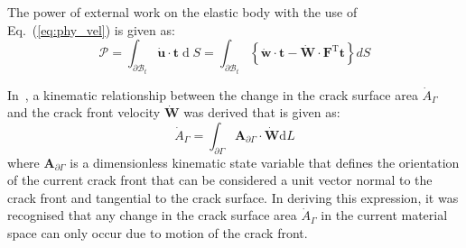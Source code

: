 \documentclass[twocolumn]{svjour3}
\begin{document}
The power of external work on the elastic body with the use of Eq.~(\ref{eq:phy_vel}) is given as: 
\begin{equation} \label{eq:extern_pow}
	\mathscr{P} =\int_{\partial \mathscr{B}_{t}} \dot{\mathbf{u}} \cdot \mathbf{t} \operatorname{d} S=\int_{\partial \mathscr{B}_{t}}\left\{\dot{\mathbf{w}} \cdot \mathbf{t}-\dot{\mathbf{W}} \cdot \mathbf{F}^{\mathrm{T}} \mathbf{t}\right\} d S
\end{equation}

In~\cite{kaczmarczyk2017energy}, a kinematic relationship between the change in the
crack surface area $\dot{A}_\Gamma$ and the crack front velocity $\dot{\mathbf{W}}$ was derived that is given as:
\begin{equation}
\label{eq::Agamma2}
\dot{A}_\Gamma
 =
\int_{\partial\Gamma}
\mathbf{A}_{\partial\Gamma} \cdot \dot{\mathbf{W}} \textrm{d}L
\end{equation}
where 
$\mathbf{A}_{\partial\Gamma}$ is a dimensionless kinematic state variable that defines the orientation of the current crack front that can be considered a unit vector normal to the crack front and tangential to the crack surface. In deriving this expression, it was recognised that any change in the crack surface area $\dot{A}_\Gamma$ in the current material space can only occur due to motion of the crack front.
\end{document}
